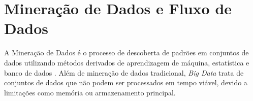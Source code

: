 \section{Mineração de Dados e Fluxo de Dados}


A Mineração de Dados é o processo de descoberta de padrões em conjuntos de dados
utilizando métodos derivados de aprendizagem de máquina, estatística e banco de
dados \cite{Gaber2005}.
Além de mineração de dados tradicional, \emph{Big Data} trata de
conjuntos de dados que não podem ser processados em tempo viável, devido a limitações
como memória ou armazenamento principal.

% 
% 


% 

